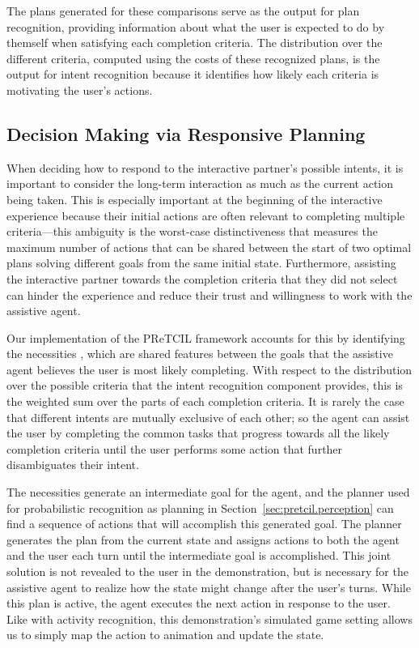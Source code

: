 \documentclass[letterpaper]{article} %
\begin{document}
The plans generated for these comparisons serve as the output for plan recognition, providing information about what the user is expected to do by themself when satisfying each completion criteria.  The distribution over the different criteria, computed using the costs of these recognized plans, is the output for intent recognition because it identifies how likely each criteria is motivating the user's actions.

\subsection{Decision Making via Responsive Planning\label{sec:pretcil.dec_making}}
When deciding how to respond to the interactive partner's possible intents, it is important to consider the long-term interaction as much as the current action being taken.  This is especially important at the beginning of the interactive experience because their initial actions are often relevant to completing multiple criteria---this ambiguity is the worst-case distinctiveness \cite{keren_ICAPS147814} that measures the maximum number of actions that can be shared between the start of two optimal plans solving different goals from the same initial state.
Furthermore, assisting the interactive partner towards the completion criteria that they did not select can hinder the experience and reduce their trust and willingness to work with the assistive agent.

Our implementation of the {\sc PReTCIL} framework accounts for this by identifying the necessities \cite{fz_aaai2017}, which are shared features between the goals that the assistive agent believes the user is most likely completing.  With respect to the distribution over the possible criteria that the intent recognition component provides, this is the weighted sum over the parts of each completion criteria.  It is rarely the case that different intents are mutually exclusive of each other; so the agent can assist the user by completing the common tasks that progress towards all the likely completion criteria until the user performs some action that further disambiguates their intent.

The necessities generate an intermediate goal for the agent, and the planner used for probabilistic recognition as planning in Section~\ref{sec:pretcil.perception} can find a sequence of actions that will accomplish this generated goal.  The planner generates the plan from the current state and assigns actions to both the agent and the user each turn until the intermediate goal is accomplished.  This joint solution is not revealed to the user in the demonstration, but is necessary for the assistive agent to realize how the state might change after the user's turns.  While this plan is active, the agent executes the next action in response to the user.  Like with activity recognition, this demonstration's simulated game setting allows us to simply map the action to animation and update the state.
\end{document}
